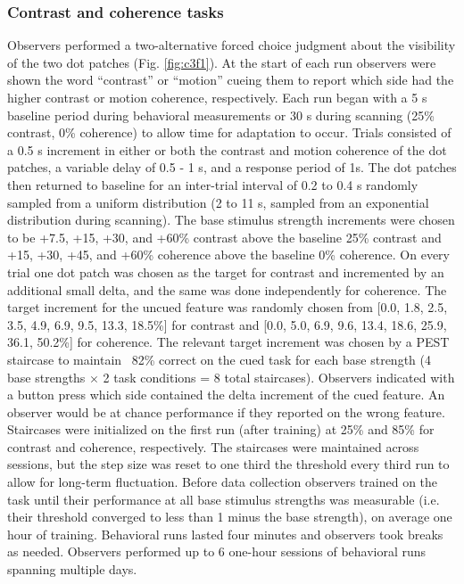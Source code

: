 \subsubsection{Contrast and coherence tasks}

Observers performed a two-alternative forced choice judgment about the visibility of the two dot patches (Fig. \ref{fig:c3f1}). At the start of each run observers were shown the word “contrast” or “motion” cueing them to report which side had the higher contrast or motion coherence, respectively. Each run began with a 5 s baseline period during behavioral measurements or 30 s during scanning (25\% contrast, 0\% coherence) to allow time for adaptation to occur. Trials consisted of a 0.5 s increment in either or both the contrast and motion coherence of the dot patches, a variable delay of 0.5 - 1 s, and a response period of 1s. The dot patches then returned to baseline for an inter-trial interval of 0.2 to 0.4 s randomly sampled from a uniform distribution (2 to 11 s, sampled from an exponential distribution during scanning). The base stimulus strength increments were chosen to be +7.5, +15, +30, and +60\% contrast above the baseline 25\% contrast and +15, +30, +45, and +60\% coherence above the baseline 0\% coherence. On every trial one dot patch was chosen as the target for contrast and incremented by an additional small delta, and the same was done independently for coherence. The target increment for the uncued feature was randomly chosen from [0.0, 1.8, 2.5, 3.5, 4.9, 6.9, 9.5, 13.3, 18.5\%] for contrast and [0.0, 5.0, 6.9, 9.6, 13.4, 18.6, 25.9, 36.1, 50.2\%] for coherence. The relevant target increment was chosen by a PEST staircase \citep{Taylor1967-yb} to maintain ~82\% correct on the cued task for each base strength (4 base strengths $\times$ 2 task conditions = 8 total staircases). Observers indicated with a button press which side contained the delta increment of the cued feature. An observer would be at chance performance if they reported on the wrong feature. Staircases were initialized on the first run (after training) at 25\% and 85\% for contrast and coherence, respectively. The staircases were maintained across sessions, but the step size was reset to one third the threshold every third run to allow for long-term fluctuation. Before data collection observers trained on the task until their performance at all base stimulus strengths was measurable (i.e. their threshold converged to less than 1 minus the base strength), on average one hour of training. Behavioral runs lasted four minutes and observers took breaks as needed. Observers performed up to 6 one-hour sessions of behavioral runs spanning multiple days.

